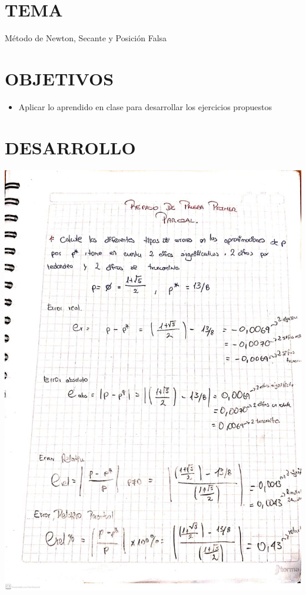 \documentclass[12pt]{article}
\begin{document}
\section*{TEMA}
{Método de Newton, Secante y Posición Falsa}

\vspace{0.5cm}

\section*{OBJETIVOS}
\begin{itemize}
    \item { Aplicar lo aprendido en clase para desarrollar los ejercicios propuestos}

\end{itemize}

\vspace{0.5cm}

\section*{DESARROLLO}


\begin{minipage}{0.95\textwidth}
    \raggedleft
    \includegraphics[width=1.15\textwidth]{inFiles/Figures/ejer1.jpeg}
\end{minipage}
\end{document}
